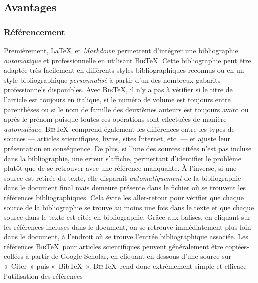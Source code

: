 \documentclass[
  letterpaper,
  DIV=11,
  numbers=noendperiod,
  oneside]{scrreprt}
\begin{document}
\setlength\LTleft{\holdLTleft}
\setlength\LTright{\holdLTright}

\hypertarget{avantages}{%
\subsection{Avantages}\label{avantages}}

\hypertarget{ruxe9fuxe9rencement}{%
\subsubsection{Référencement}\label{ruxe9fuxe9rencement}}

Premièrement, \LaTeX{}~et \emph{Markdown} permettent d'intégrer une
bibliographie \emph{automatique} et professionnelle en utilisant
\textsc{Bib}\TeX. Cette bibliographie peut être adaptée très facilement
en différents styles bibliographiques reconnus ou en un style
bibliographique \emph{personnalisé} à partir d'un des nombreux gabarits
professionnels disponibles. Avec \textsc{Bib}\TeX, il n'y a pas à
vérifier si le titre de l'article est toujours en italique, si le numéro
de volume est toujours entre parenthèses ou si le nom de famille des
deuxièmes auteurs est toujours avant ou après le prénom puisque toutes
ces opérations sont effectuées de manière \emph{automatique}.
\textsc{Bib}\TeX{}~comprend également les différences entre les types de
sources --- articles scientifiques, livres, sites Internet, etc. --- et
ajuste leur présentation en conséquence. De plus, si l'une des sources
citées n'est pas incluse dans la bibliographie, une erreur s'affiche,
permettant d'identifier le problème plutôt que de se retrouver avec une
référence manquante. À l'inverse, si une source est retirée du texte,
elle disparait \emph{automatiquement} de la bibliographie dans le
document final mais demeure présente dans le fichier où se trouvent les
références bibliographiques. Cela évite les aller-retour pour vérifier
que chaque source de la bibliographie se trouve au moins une fois dans
le texte et que chaque source dans le texte est citée en bibliographie.
Grâce aux balises, en cliquant sur les références incluses dans le
document, on se retrouve immédiatement plus loin dans le document, à
l'endroit où se trouve l'entrée bibliographique associée. Les références
\textsc{Bib}\TeX{}~pour articles scientifiques peuvent généralement être
copiées-collées à partir de Google Scholar, en cliquant en dessous d'une
source sur «~Citer~» puis «~BibTeX~». \textsc{Bib}\TeX{}~rend donc
extrêmement simple et efficace l'utilisation des références
\end{document}
